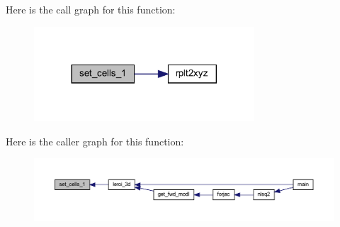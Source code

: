 Here is the call graph for this function\+:\nopagebreak
\begin{figure}[H]
\begin{center}
\leavevmode
\includegraphics[width=233pt]{Leroi_8f90_a34542cb94b24b37bf99b63f2e3e5e368_cgraph}
\end{center}
\end{figure}
Here is the caller graph for this function\+:\nopagebreak
\begin{figure}[H]
\begin{center}
\leavevmode
\includegraphics[width=350pt]{Leroi_8f90_a34542cb94b24b37bf99b63f2e3e5e368_icgraph}
\end{center}
\end{figure}
\mbox{\label{Leroi_8f90_a14cc0157cbf2d5d8c0af6167028061cf}} 
